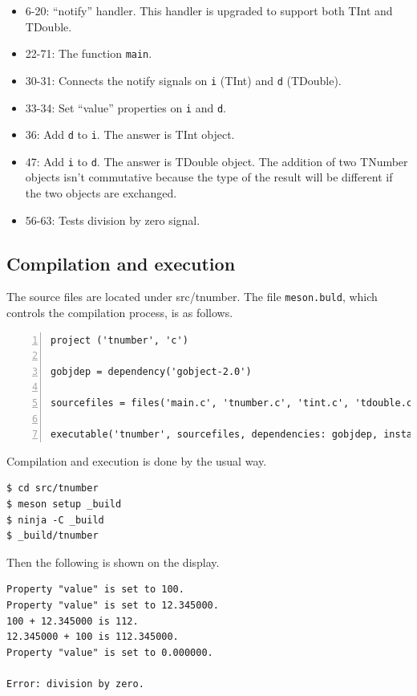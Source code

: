 \begin{itemize}
\tightlist
\item
  6-20: ``notify'' handler. This handler is upgraded to support both
  TInt and TDouble.
\item
  22-71: The function \passthrough{\lstinline!main!}.
\item
  30-31: Connects the notify signals on \passthrough{\lstinline!i!}
  (TInt) and \passthrough{\lstinline!d!} (TDouble).
\item
  33-34: Set ``value'' properties on \passthrough{\lstinline!i!} and
  \passthrough{\lstinline!d!}.
\item
  36: Add \passthrough{\lstinline!d!} to \passthrough{\lstinline!i!}.
  The answer is TInt object.
\item
  47: Add \passthrough{\lstinline!i!} to \passthrough{\lstinline!d!}.
  The answer is TDouble object. The addition of two TNumber objects
  isn't commutative because the type of the result will be different if
  the two objects are exchanged.
\item
  56-63: Tests division by zero signal.
\end{itemize}

\subsection{Compilation and execution}\label{compilation-and-execution}

The source files are located under src/tnumber. The file
\passthrough{\lstinline!meson.buld!}, which controls the compilation
process, is as follows.

\begin{lstlisting}[numbers=left]
project ('tnumber', 'c')

gobjdep = dependency('gobject-2.0')

sourcefiles = files('main.c', 'tnumber.c', 'tint.c', 'tdouble.c')

executable('tnumber', sourcefiles, dependencies: gobjdep, install: false)
\end{lstlisting}

Compilation and execution is done by the usual way.

\begin{lstlisting}
$ cd src/tnumber
$ meson setup _build
$ ninja -C _build
$ _build/tnumber
\end{lstlisting}

Then the following is shown on the display.

\begin{lstlisting}
Property "value" is set to 100.
Property "value" is set to 12.345000.
100 + 12.345000 is 112.
12.345000 + 100 is 112.345000.
Property "value" is set to 0.000000.

Error: division by zero.
\end{lstlisting}

